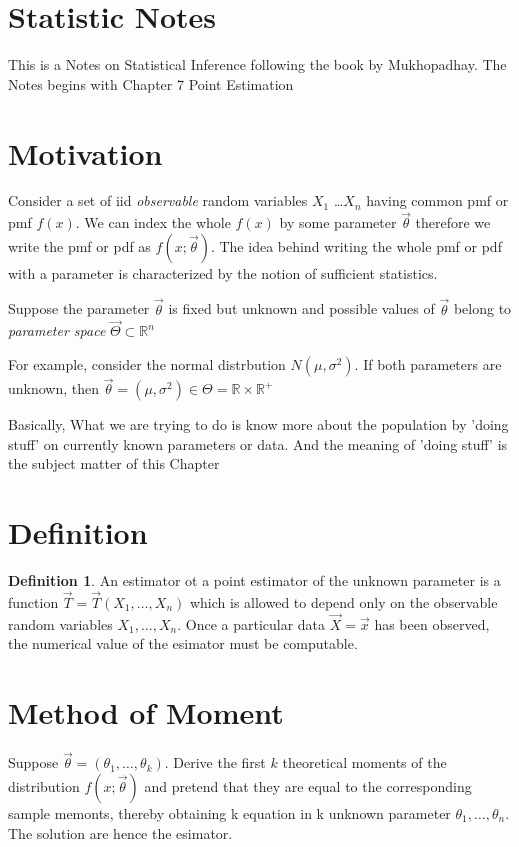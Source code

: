 \documentclass{article}
\theoremstyle{definition}
\newtheorem{definition}{Definition}[section]
\begin{document}
\section*{Statistic Notes}
This is a Notes on Statistical Inference following the book by Mukhopadhay. The Notes begins with Chapter 7 Point Estimation
\section*{Motivation}


Consider a set of iid \textit{observable} random variables $X_1$ \dots $X_n$ having common pmf or pmf $f(x)$. We can index the whole $f(x)$ by some parameter $\vec{\theta}$ therefore we write the pmf or pdf as $f(x;\vec{\theta})$. The idea behind writing the whole pmf or pdf with a parameter is characterized by the notion of sufficient statistics.


Suppose the parameter $\vec{\theta}$ is fixed but unknown and possible values of $\vec{\theta}$ belong to \textit{parameter space} $\vec{\Theta} \subset \mathbb{R}^n$

For example, consider the normal distrbution $N(\mu,\sigma^2)$. If both parameters are unknown, then $\vec{\theta} = (\mu,\sigma^2) \in \Theta = \mathbb{R} \times \mathbb{R}^+$

Basically, What we are trying to do is know more about the population by 'doing stuff' on currently known parameters or data. And the meaning of 'doing stuff' is the subject matter of this Chapter

\section{Definition}
\begin{definition}
	An estimator ot a point estimator of the unknown parameter is a function $\vec{T} = \vec{T}(X_1,\dots,X_n)$ which is allowed to depend only on the observable random variables $X_1,\dots,X_n$. Once a particular data $\vec{X} = \vec{x}$ has been observed, the numerical value of the esimator must be computable.
\end{definition}

\section{Method of Moment}
Suppose $\vec{\theta} = (\theta_1,\dots,\theta_k)$. Derive the first $k$ theoretical moments of the distribution $f(x;\vec{\theta})$ and pretend that they are equal to the corresponding sample memonts, thereby obtaining k equation in k unknown parameter $\theta_1,\dots,\theta_n$. The solution are hence the esimator.
\end{document}
